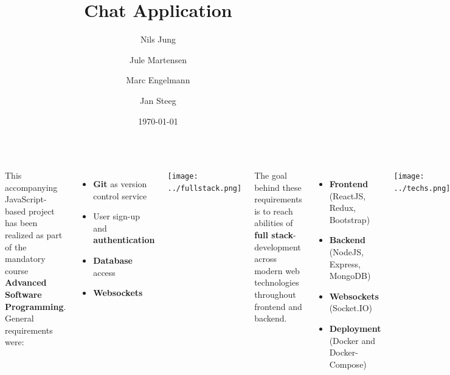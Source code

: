 \documentclass[20pt, a1paper]{tikzposter}
\title{Chat Application}
\author{Nils Jung}
\author{Jule Martensen}
\author{Marc Engelmann}
\author{Jan Steeg}
\affil{University of Applied Sciences Kiel}
\date{\today}
\makeatletter
\def\maketitle{\AB@maketitle}
\makeatother
\begin{document}
	\maketitle
	
	\begin{columns}
	{
		This accompanying JavaScript-based project has been realized as part of the mandatory course \textbf{Advanced Software Programming}.\\
		General requirements were:\\
	
		\begin{minipage}{0.55\linewidth}
			\begin{itemize}
				\item \textbf{Git} as version control service
				\item User sign-up and \textbf{authentication}
				\item \textbf{Database} access
				\item \textbf{Websockets}\\
			\end{itemize}
		\end{minipage}
		\begin{minipage}{0.45\linewidth}
		 \begin{tikzfigure}
		 	\texttt{[image: ../fullstack.png]}
		 \end{tikzfigure}
		\end{minipage}
	\vspace{1.5cm}
		
		The goal behind these requirements is to reach abilities of \textbf{full stack}-development across modern web technologies throughout frontend and backend.\\
	}
	{
		\begin{itemize}
			\item \textbf{Frontend} (ReactJS, Redux, Bootstrap)
			\item \textbf{Backend} (NodeJS, Express, MongoDB)
			\item \textbf{Websockets} (Socket.IO)
			\item \textbf{Deployment} (Docker and Docker-Compose)
		\end{itemize}
		
		\begin{tikzfigure}
			\texttt{[image: ../techs.png]}
		\end{tikzfigure}
	}
	{
		\url{https://github.com/nilsjung/chat-application}\\
		\url{https://reactjs.org/}\\
		\url{https://redux.js.org/}\\

}
\end{columns}
\end{document}
